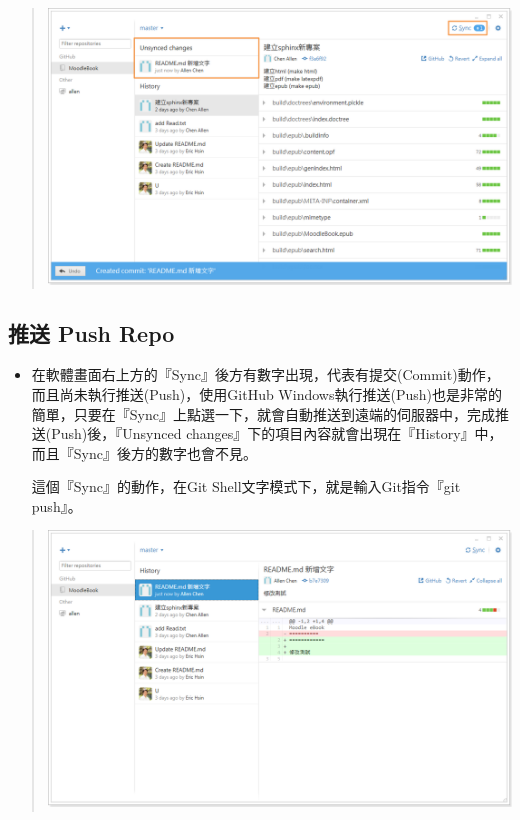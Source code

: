 \documentclass[letterpaper,10pt,english]{sphinxmanual}
\begin{document}
\begin{quote}

\includegraphics{GitHub-Commit-003.png}
\end{quote}


\subsection{推送 Push Repo}
\label{_doc/writing/index-github:push-repo}\begin{itemize}
\item {} 
在軟體畫面右上方的『Sync』後方有數字出現，代表有提交(Commit)動作，而且尚未執行推送(Push)，使用GitHub Windows執行推送(Push)也是非常的簡單，只要在『Sync』上點選一下，就會自動推送到遠端的伺服器中，完成推送(Push)後，『Unsynced changes』下的項目內容就會出現在『History』中，而且『Sync』後方的數字也會不見。

這個『Sync』的動作，在Git Shell文字模式下，就是輸入Git指令『git push』。

\end{itemize}
\begin{quote}

\includegraphics{GitHub-Commit-004.png}
\end{quote}
\end{document}
